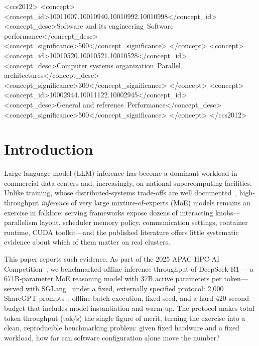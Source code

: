 \documentclass[sigconf]{acmart}
\begin{document}
\begin{CCSXML}
<ccs2012>
 <concept>
  <concept_id>10011007.10010940.10010992.10010998</concept_id>
  <concept_desc>Software and its engineering~Software performance</concept_desc>
  <concept_significance>500</concept_significance>
 </concept>
 <concept>
  <concept_id>10010520.10010521.10010528</concept_id>
  <concept_desc>Computer systems organization~Parallel architectures</concept_desc>
  <concept_significance>300</concept_significance>
 </concept>
 <concept>
  <concept_id>10002944.10011122.10002945</concept_id>
  <concept_desc>General and reference~Performance</concept_desc>
  <concept_significance>500</concept_significance>
 </concept>
</ccs2012>
\end{CCSXML}



\maketitle

\section{Introduction}
Large language model (LLM) inference has become a dominant workload in commercial data centers and, increasingly, on national supercomputing facilities. Unlike training, whose distributed-systems trade-offs are well documented~\cite{shoeybi2019megatron,narayanan2021efficient}, high-throughput \emph{inference} of very large mixture-of-experts (MoE) models remains an exercise in folklore: serving frameworks expose dozens of interacting knobs---parallelism layout, scheduler memory policy, communication settings, container runtime, CUDA toolkit---and the published literature offers little systematic evidence about which of them matter on real clusters.

This paper reports such evidence. As part of the 2025 APAC HPC-AI Competition~\cite{apachpcai2025}, we benchmarked offline inference throughput of DeepSeek-R1~\cite{deepseekr1}---a 671B-parameter MoE reasoning model with 37B active parameters per token---served with SGLang~\cite{zheng2024sglang} under a fixed, externally specified protocol: 2{,}000 ShareGPT prompts~\cite{sharegpt}, offline batch execution, fixed seed, and a hard 420-second budget that includes model instantiation and warm-up. The protocol makes total token throughput (tok/s) the single figure of merit, turning the exercise into a clean, reproducible benchmarking problem: given fixed hardware and a fixed workload, how far can software configuration alone move the number?
\end{document}
